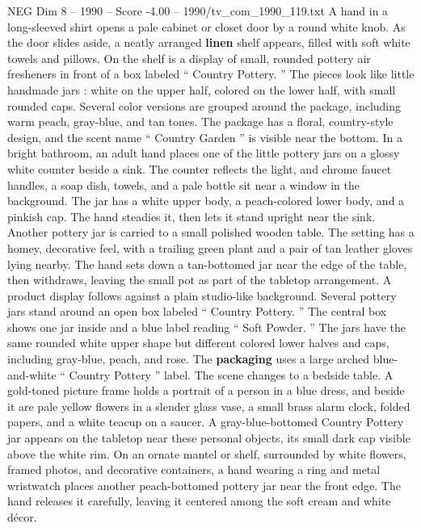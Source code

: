 \begin{textsample}{NEG Dim 8 – 1990 – Score -4.00 – 1990/tv\_com\_1990\_119.txt}  \label{ex:f8_neg_032}
A hand in a long-sleeved shirt opens a pale cabinet or closet door by a round white knob.
As the door slides aside, a neatly arranged \textbf{linen} shelf appears, filled with soft white towels and pillows.
On the shelf is a display of small, rounded pottery air fresheners in front of a box labeled “ Country Pottery. ” The pieces look like little handmade jars : white on the upper half, colored on the lower half, with small rounded caps.
Several color versions are grouped around the package, including warm peach, gray-blue, and tan tones.
The package has a floral, country-style design, and the scent name “ Country Garden ” is visible near the bottom.
In a bright bathroom, an adult hand places one of the little pottery jars on a glossy white counter beside a sink.
The counter reflects the light, and chrome faucet handles, a soap dish, towels, and a pale bottle sit near a window in the background.
The jar has a white upper body, a peach-colored lower body, and a pinkish cap.
The hand steadies it, then lets it stand upright near the sink.
Another pottery jar is carried to a small polished wooden table.
The setting has a homey, decorative feel, with a trailing green plant and a pair of tan leather gloves lying nearby.
The hand sets down a tan-bottomed jar near the edge of the table, then withdraws, leaving the small pot as part of the tabletop arrangement.
A product display follows against a plain studio-like background.
Several pottery jars stand around an open box labeled “ Country Pottery. ” The central box shows one jar inside and a blue label reading “ Soft Powder. ” The jars have the same rounded white upper shape but different colored lower halves and caps, including gray-blue, peach, and rose.
The \textbf{packaging} uses a large arched blue-and-white “ Country Pottery ” label.
The scene changes to a bedside table.
A gold-toned picture frame holds a portrait of a person in a blue dress, and beside it are pale yellow flowers in a slender glass vase, a small brass alarm clock, folded papers, and a white teacup on a saucer.
A gray-blue-bottomed Country Pottery jar appears on the tabletop near these personal objects, its small dark cap visible above the white rim.
On an ornate mantel or shelf, surrounded by white flowers, framed photos, and decorative containers, a hand wearing a ring and metal wristwatch places another peach-bottomed pottery jar near the front edge.
The hand releases it carefully, leaving it centered among the soft cream and white décor.

\end{textsample}

